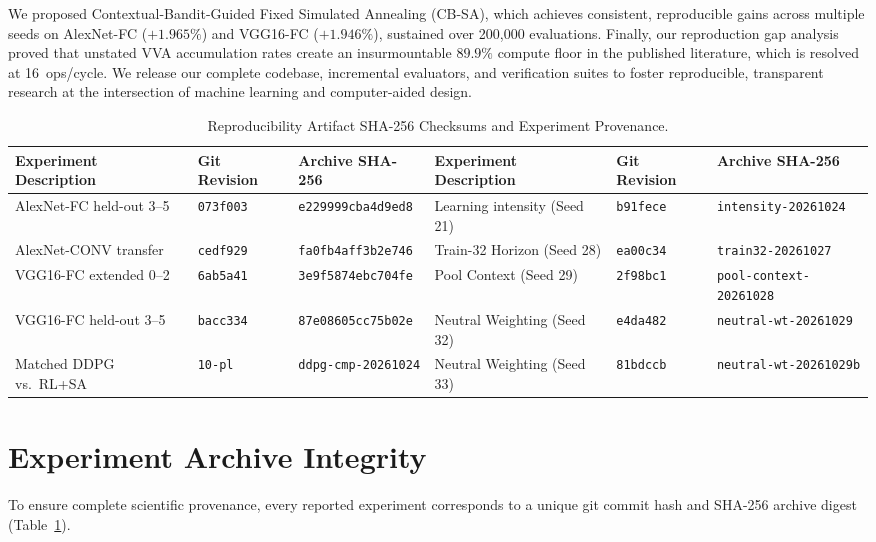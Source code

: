 \documentclass[10pt,conference]{IEEEtran}
\begin{document}
We proposed Contextual-Bandit-Guided Fixed Simulated Annealing (CB-SA), which achieves consistent, reproducible gains across multiple seeds on AlexNet-FC ($+1.965\%$) and VGG16-FC ($+1.946\%$), sustained over 200,000 evaluations. Finally, our reproduction gap analysis proved that unstated VVA accumulation rates create an insurmountable $89.9\%$ compute floor in the published literature, which is resolved at 16~ops/cycle. We release our complete codebase, incremental evaluators, and verification suites to foster reproducible, transparent research at the intersection of machine learning and computer-aided design.

\appendix

\begin{table}[t]
  \caption{Reproducibility Artifact SHA-256 Checksums and Experiment Provenance.}
  \label{tab:artifact-hashes}
  \centering
  \small
  \begin{tabular}{lll lll}
    \toprule
    Experiment Description & Git Revision & Archive SHA-256 & Experiment Description & Git Revision & Archive SHA-256 \\
    \midrule
    AlexNet-FC held-out 3--5 & \texttt{073f003} & \texttt{e229999cba4d9ed8} & Learning intensity (Seed 21) & \texttt{b91fece} & \texttt{intensity-20261024} \\
    AlexNet-CONV transfer     & \texttt{cedf929} & \texttt{fa0fb4aff3b2e746} & Train-32 Horizon (Seed 28)  & \texttt{ea00c34} & \texttt{train32-20261027} \\
    VGG16-FC extended 0--2    & \texttt{6ab5a41} & \texttt{3e9f5874ebc704fe} & Pool Context (Seed 29)      & \texttt{2f98bc1} & \texttt{pool-context-20261028} \\
    VGG16-FC held-out 3--5    & \texttt{bacc334} & \texttt{87e08605cc75b02e} & Neutral Weighting (Seed 32) & \texttt{e4da482} & \texttt{neutral-wt-20261029} \\
    Matched DDPG vs.\ RL+SA   & \texttt{10-pl}   & \texttt{ddpg-cmp-20261024} & Neutral Weighting (Seed 33) & \texttt{81bdccb} & \texttt{neutral-wt-20261029b} \\
    \bottomrule
  \end{tabular}
\end{table}

\section{Experiment Archive Integrity}
\label{app:hashes}
To ensure complete scientific provenance, every reported experiment corresponds to a unique git commit hash and SHA-256 archive digest (Table~\ref{tab:artifact-hashes}).
\end{document}
